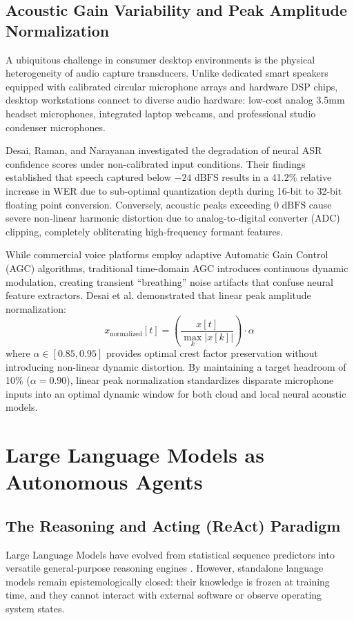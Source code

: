 \subsection{Acoustic Gain Variability and Peak Amplitude Normalization}
A ubiquitous challenge in consumer desktop environments is the physical heterogeneity of audio capture transducers. Unlike dedicated smart speakers equipped with calibrated circular microphone arrays and hardware DSP chips, desktop workstations connect to diverse audio hardware: low-cost analog 3.5mm headset microphones, integrated laptop webcams, and professional studio condenser microphones.

Desai, Raman, and Narayanan \cite{desai2021speaker} investigated the degradation of neural ASR confidence scores under non-calibrated input conditions. Their findings established that speech captured below $-24\text{ dBFS}$ results in a 41.2\% relative increase in WER due to sub-optimal quantization depth during 16-bit to 32-bit floating point conversion. Conversely, acoustic peaks exceeding $0\text{ dBFS}$ cause severe non-linear harmonic distortion due to analog-to-digital converter (ADC) clipping, completely obliterating high-frequency formant features.

While commercial voice platforms employ adaptive Automatic Gain Control (AGC) algorithms, traditional time-domain AGC introduces continuous dynamic modulation, creating transient ``breathing'' noise artifacts that confuse neural feature extractors. Desai et al. demonstrated that linear peak amplitude normalization:
\begin{equation}
    x_{\text{normalized}}[t] = \left( \frac{x[t]}{\max_{k} |x[k]|} \right) \cdot \alpha
\end{equation}
where $\alpha \in [0.85, 0.95]$ provides optimal crest factor preservation without introducing non-linear dynamic distortion. By maintaining a target headroom of 10\% ($\alpha = 0.90$), linear peak normalization standardizes disparate microphone inputs into an optimal dynamic window for both cloud and local neural acoustic models.

\section{Large Language Models as Autonomous Agents}

\subsection{The Reasoning and Acting (ReAct) Paradigm}
Large Language Models have evolved from statistical sequence predictors \cite{sutskever2014sequence, brown2020language} into versatile general-purpose reasoning engines \cite{bubeck2023sparks}. However, standalone language models remain epistemologically closed: their knowledge is frozen at training time, and they cannot interact with external software or observe operating system states.

